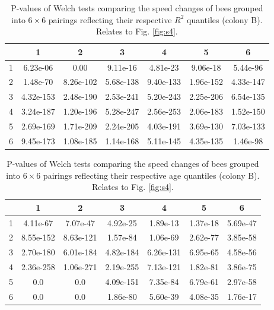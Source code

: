 \documentclass{article}
\begin{document}
\begin{table}[h!]
\centering
\def\tablename{Supplementary Table}
\caption{
P-values of Welch tests comparing the speed changes of bees grouped into $6 \times 6$ pairings reflecting their respective $R^2$ quantiles (colony B). Relates to Fig. \ref{fig:s4}.
}
\begin{tabular}{|c|c|c|c|c|c|c|}
\hline
 & 1 & 2 & 3 & 4 & 5 & 6 \\ \hline
1 & 6.23e-06 & 0.00 & 9.11e-16 & 4.81e-23 & 9.06e-18 & 5.44e-96 \\ \hline
2 & 1.48e-70 & 8.26e-102 & 5.68e-138 & 9.40e-133 & 1.96e-152 & 4.33e-147 \\ \hline
3 & 4.32e-153 & 2.48e-190 & 2.53e-241 & 5.20e-243 & 2.25e-206 & 6.54e-135 \\ \hline
4 & 3.24e-187 & 1.20e-196 & 5.28e-247 & 2.56e-253 & 2.06e-183 & 1.52e-150 \\ \hline
5 & 2.69e-169 & 1.71e-209 & 2.24e-205 & 4.03e-191 & 3.69e-130 & 7.03e-133 \\ \hline
6 & 9.45e-173 & 1.08e-185 & 1.14e-168 & 5.11e-145 & 4.35e-135 & 1.46e-98 \\ \hline
\end{tabular}
\end{table}

\begin{table}[h!]
\centering
\def\tablename{Supplementary Table}
\caption{
P-values of Welch tests comparing the speed changes of bees grouped into $6 \times 6$ pairings reflecting their respective age quantiles (colony B). Relates to Fig. \ref{fig:s4}.
}
\begin{tabular}{|c|c|c|c|c|c|c|}
\hline
 & 1 & 2 & 3 & 4 & 5 & 6 \\ \hline
1 & 4.11e-67 & 7.07e-47 & 4.92e-25 & 1.89e-13 & 1.37e-18 & 5.69e-47 \\ \hline
2 & 8.55e-152 & 8.63e-121 & 1.57e-84 & 1.06e-69 & 2.62e-77 & 3.85e-58 \\ \hline
3 & 2.70e-180 & 6.01e-184 & 4.82e-184 & 6.26e-131 & 6.95e-65 & 4.58e-56 \\ \hline
4 & 2.36e-258 & 1.06e-271 & 2.19e-255 & 7.13e-121 & 1.82e-81 & 3.86e-75 \\ \hline
5 & 0.0 & 0.0 & 4.09e-151 & 7.35e-84 & 6.79e-61 & 2.97e-58 \\ \hline
6 & 0.0 & 0.0 & 1.86e-80 & 5.60e-39 & 4.08e-35 & 1.76e-17 \\ \hline
\end{tabular}
\end{table}
\end{document}
